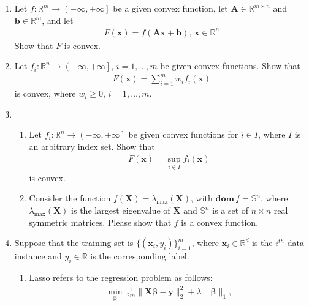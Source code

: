 \documentclass[11pt,letter,notitlepage]{article}
\theoremstyle{definition}
\newcommand{\dom}{ \textbf{dom}  }
\begin{document}
\begin{exercise}
	\begin{enumerate}
		\item Let $f:\mathbb{R}^m \rightarrow \left( -\infty,+\infty \right]$ be a given convex function, let $\mathbf{A}\in \mathbb{R}^{m \times n}$ and $\mathbf{b} \in \mathbb{R}^m$, and let
		      \begin{align*}
			      F(\mathbf{x}) = f(\mathbf{Ax+b}),\,\mathbf{x}\in\mathbb{R}^n
		      \end{align*}
		      Show that $F$ is convex.
		\item Let $f_i:\mathbb{R}^n \rightarrow \left(-\infty,+\infty \right]$, $i=1,\dots,m$ be given convex functions. Show that
		      \begin{align*}
			      F(\mathbf{x}) = \sum_{i=1}^m w_if_i(\mathbf{x})
		      \end{align*}
		      is convex, where $w_i \geq 0,\,i=1,\dots,m$.
		\item \begin{enumerate}
			      \item Let $f_i:\mathbb{R}^n \rightarrow \left(-\infty,+\infty \right]$ be given convex functions for $i \in I$, where $I$ is an arbitrary index set. Show that
			            \begin{align*}
				            F(\mathbf{x}) = \sup_{i\in I}f_i(\mathbf{x})
			            \end{align*}
			            is convex.
			      \item Consider the function $f(\mathbf{X})=\lambda_{\max}(\mathbf{X})$, with $\dom\, f =\mathbb{S}^n$, where $\lambda_{\max}(\mathbf{X})$ is the largest eigenvalue of $\mathbf{X}$ and $\mathbb{S}^n$ is a set of $n\times n$ real symmetric matrices. Please show that $f$ is a convex function.
		      \end{enumerate}
		\item Suppose that the training set is $\{(\mathbf{x}_i,y_i)\}_{i=1}^m$, where $\mathbf{x}_i\in\mathbb{R}^d$ is the $i^{th}$ data instance and $y_i\in\mathbb{R}$ is the corresponding label.
		      \begin{enumerate}
			      \item Lasso refers to the regression problem as follows:
			            \begin{align*}
				            \min_{\boldsymbol{\beta}}\,\frac{1}{2m}\|\mathbf{X}\boldsymbol{\beta}-\mathbf{y}\|_2^2+\lambda\|\boldsymbol{\beta}\|_1,
			            \end{align*}

\end{enumerate}
\end{enumerate}
\end{exercise}
\end{document}

